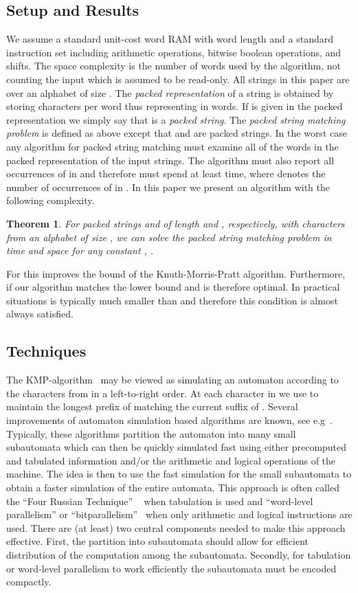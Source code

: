 \documentclass{article}
\newtheorem{theorem}{Theorem}
\begin{document}
\subsection{Setup and Results}
We assume a standard unit-cost word RAM with word length  and a standard instruction set including arithmetic
operations, bitwise boolean operations, and shifts. The space
complexity is the number of words used by the algorithm, not counting
the input which is assumed to be read-only. All strings in this paper
are over an alphabet  of size . The \emph{packed
  representation} of a string  is obtained by storing  characters per word thus representing  in
 words. If  is
given in the packed representation we simply say that  is a
\emph{packed string}. The \emph{packed string matching problem} is
defined as above except that  and  are packed strings. In the
worst case any algorithm for packed string matching must examine all
of the words in the packed representation of the input strings. The
algorithm must also report all occurrences of  in  and therefore
must spend at least  time, where  denotes the number of occurrences of
 in . In this paper we present an algorithm with the following
complexity.
\begin{theorem}\label{thm:main}
For packed strings  and  of length  and , respectively,
with characters from an alphabet of size , we can solve the
packed string matching problem in time  and space  for any
constant , .  
\end{theorem}
For  this improves the  bound of the
Knuth-Morris-Pratt algorithm. Furthermore, if 
our algorithm matches the lower bound and is therefore optimal. In
practical situations  is typically much smaller than  and
therefore this condition is almost always satisfied.

\subsection{Techniques}\label{sec:techniques}
The KMP-algorithm~\cite{KMP1977} may be viewed as simulating an
automaton  according to the characters from  in a left-to-right
order. At each character in  we use  to maintain the longest
prefix of  matching the current suffix of . Several improvements
of automaton simulation based algorithms are known, see
e.g~\cite{MP1980, Myers1992,BYG1992, WMM1995}. Typically, these
algorithms partition the automaton into many small subautomata which
can then be quickly simulated fast using either precomputed and
tabulated information and/or the arithmetic and logical operations of
the machine. The idea is then to use the fast simulation for the small
subautomata to obtain a faster simulation of the entire automata. This
approach is often called the ``Four Russian Technique''
~\cite{ADKF1970} when tabulation is used and ``word-level
parallelism'' or ``bitparallelism''~\cite{BaezaYates1989} when only
arithmetic and logical instructions are used. There are (at least) two
central components needed to make this approach effective. First, the
partition into subautomata should allow for efficient distribution of
the computation among the subautomata. Secondly, for tabulation or
word-level parallelism to work efficiently the subautomata must be
encoded compactly.
\end{document}

